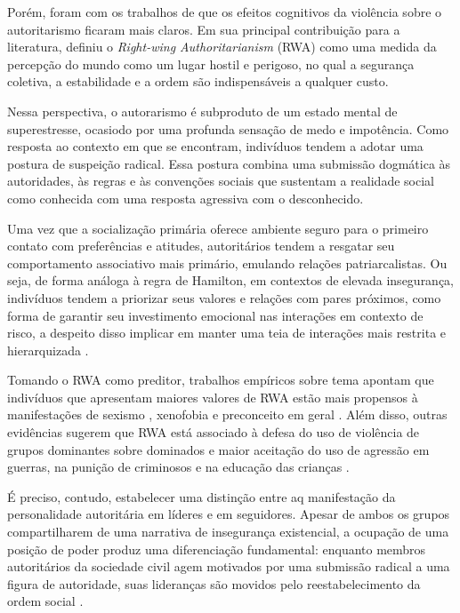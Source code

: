 \documentclass[
12pt,				%
openright,			%
twoside,			%
a4paper,			%
english,			%
french,				%
spanish,			%
brazil				%
]{abntex2}
\begin{document}
Porém, foram com os trabalhos de  que os efeitos cognitivos da violência sobre o autoritarismo ficaram mais claros. Em sua principal contribuição para a literatura, definiu o \emph{Right-wing Authoritarianism} (RWA) como uma medida da percepção do mundo como um lugar hostil e perigoso, no qual a segurança coletiva, a estabilidade e a ordem são indispensáveis a qualquer custo.

Nessa perspectiva, o autorarismo é subproduto de um estado mental de superestresse, ocasiodo por uma profunda sensação de medo e impotência. Como resposta ao contexto em que se encontram, indivíduos tendem a adotar uma postura de suspeição radical. Essa postura combina uma submissão dogmática às autoridades, às regras e às convenções sociais que sustentam a realidade social como conhecida com uma resposta agressiva com o desconhecido.

Uma vez que a socialização primária oferece ambiente seguro para o primeiro contato com preferências e atitudes, autoritários tendem a resgatar seu comportamento associativo mais primário, emulando relações patriarcalistas. Ou seja, de forma análoga à regra de Hamilton, em contextos de elevada insegurança, indivíduos tendem a priorizar seus valores e relações com pares próximos, como forma de garantir seu investimento emocional nas interações em contexto de risco, a despeito disso implicar em manter uma teia de interações mais restrita e hierarquizada \cite{ohtsuki2006cooperation}.

Tomando o RWA como preditor, trabalhos empíricos sobre tema apontam que indivíduos que apresentam maiores valores de RWA estão mais propensos à manifestações de sexismo \cite{sibley2007antecedents}, xenofobia \cite{thomsen2008we} e preconceito em geral \cite{asbrock2010right}. Além disso, outras evidências sugerem que RWA está associado à defesa do uso de violência de grupos dominantes sobre dominados \cite{henry2005social} e maior aceitação do uso de agressão em guerras, na punição de criminosos e na educação das crianças \cite{benjamin2006relationship}.

É preciso, contudo, estabelecer uma distinção entre aq manifestação da personalidade autoritária em líderes e em seguidores. Apesar de ambos os grupos compartilharem de uma narrativa de insegurança existencial, a ocupação de uma posição de poder produz uma diferenciação fundamental: enquanto membros autoritários da sociedade civil agem motivados por uma submissão radical a uma figura de autoridade, suas lideranças são movidos pelo reestabelecimento da ordem social \cite{altemeyer2006authoritarians}.
\end{document}
